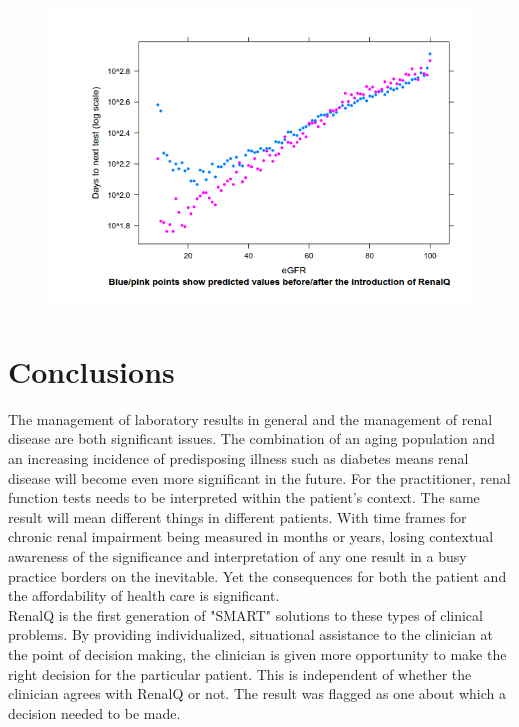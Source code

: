 \documentclass[11pt]{article}
\begin{document}
\begin{figure}[htp]
\centering
\includegraphics[scale=0.50]{FigCritical.png}
\caption{}
\label{}
\end{figure}

\section{Conclusions}
The management of laboratory results in general and the management of renal disease are both significant issues. The combination of an aging population and an increasing incidence of predisposing illness such as diabetes means renal disease will become even more significant in the future. For the practitioner, renal function tests needs to be interpreted within the patient's context. The same result will mean different things in different patients. With time frames for chronic renal impairment being measured in months or years, losing contextual awareness of the significance and interpretation of any one result in a busy practice borders on the inevitable. Yet the consequences for both the patient and the affordability of health care is significant.\\

RenalQ is the first generation of "SMART" solutions to these types of clinical problems. By providing individualized, situational assistance to the clinician at the point of decision making, the clinician is given more opportunity to make the right decision for the particular patient. This is independent of whether the clinician agrees with RenalQ or not. The result was flagged as one about which a decision needed to be made.\\ 
\end{document}
